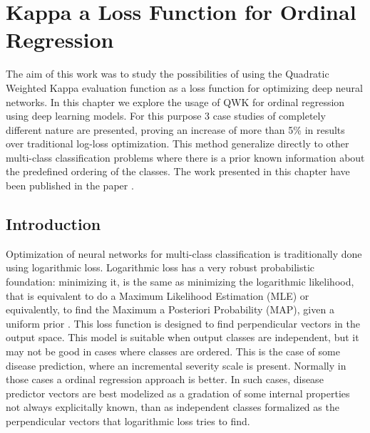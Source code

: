 
\chapter{Kappa a Loss Function for Ordinal Regression} %

\label{Chapter:QWK_loss} %

The aim of this work was to study the possibilities of using the Quadratic Weighted Kappa evaluation function as a loss function for optimizing deep neural networks. In this chapter we explore the usage of QWK for ordinal regression using deep learning models. For this purpose 3 case studies of completely different nature are presented, proving an increase of more than 5\% in results over traditional log-loss optimization. This method generalize directly to other multi-class classification problems where there is a prior known information about the predefined ordering of the classes. The work presented in this chapter have been published in the paper \citep{delatorre2017}.


\section{Introduction}

Optimization of neural networks for multi-class classification is traditionally done using logarithmic loss. Logarithmic loss has a very robust probabilistic foundation: minimizing it, is the same as minimizing the logarithmic likelihood, that is equivalent to do a Maximum Likelihood Estimation (MLE) or equivalently, to find the Maximum a Posteriori Probability (MAP), given a uniform prior \citep{Murphy:2012:MLP:2380985}. This loss function is designed to find perpendicular vectors in the output space. This model is suitable when output classes are independent, but it may not be good in cases where classes are ordered. This is the case of some disease prediction, where an incremental severity scale is present. Normally in those cases a ordinal regression approach is better. In such cases, disease predictor vectors are best modelized as a gradation of some internal properties not always explicitally known, than as independent classes formalized as the perpendicular vectors that logarithmic loss tries to find.

